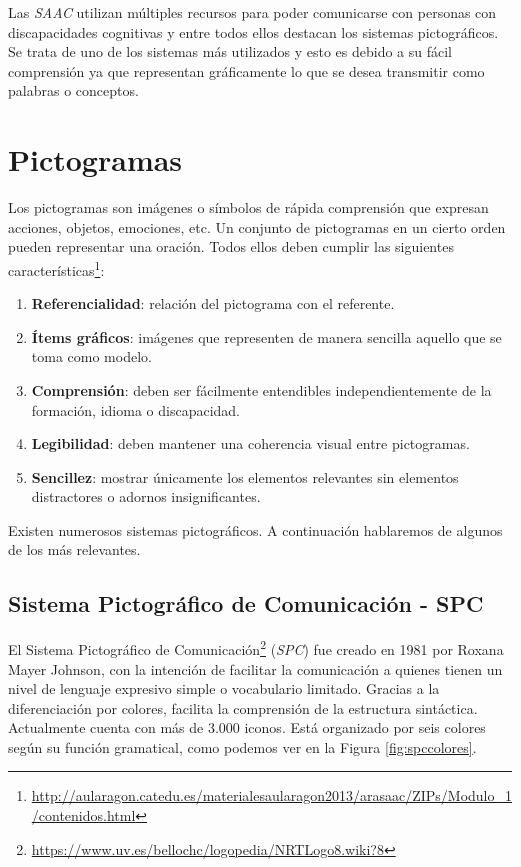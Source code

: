 Las \textit{SAAC} utilizan múltiples recursos para poder comunicarse con personas con discapacidades cognitivas y entre todos ellos destacan los sistemas pictográficos. Se trata de uno de los sistemas más utilizados y esto es debido a su fácil comprensión ya que representan gráficamente lo que se desea transmitir como palabras o conceptos. 

\section{Pictogramas}
\label{cap3:sec:pictogramas}
Los pictogramas son imágenes o símbolos de rápida comprensión que expresan acciones, objetos, emociones, etc. Un conjunto de pictogramas en un cierto orden pueden representar una oración. Todos ellos deben cumplir las siguientes características\footnote{\url{http://aularagon.catedu.es/materialesaularagon2013/arasaac/ZIPs/Modulo_1/contenidos.html}}:
\begin{enumerate}
	\item \textbf{Referencialidad}: relación del pictograma con el referente.
	\item \textbf{Ítems gráficos}: imágenes que representen de manera sencilla aquello que se toma como modelo.
	\item \textbf{Comprensión}: deben ser fácilmente entendibles independientemente de la formación, idioma o discapacidad.
	\item \textbf{Legibilidad}: deben mantener una coherencia visual entre pictogramas.
	\item \textbf{Sencillez}: mostrar únicamente los elementos relevantes sin elementos distractores o adornos insignificantes.
\end{enumerate}


 
Existen numerosos sistemas pictográficos. A continuación hablaremos de algunos de los más relevantes.

\subsection{Sistema Pictográfico de Comunicación - SPC}

El Sistema Pictográfico de Comunicación\footnote{\url{https://www.uv.es/bellochc/logopedia/NRTLogo8.wiki?8}} (\textit{SPC}) fue creado en 1981 por Roxana Mayer Johnson, con la intención de facilitar la comunicación a quienes tienen un nivel de lenguaje expresivo simple o vocabulario limitado. Gracias a la diferenciación por colores, facilita la comprensión de la estructura sintáctica. Actualmente cuenta con más de 3.000 iconos. Está organizado por seis colores según su función gramatical, como podemos ver en la Figura \ref{fig:spccolores}.


